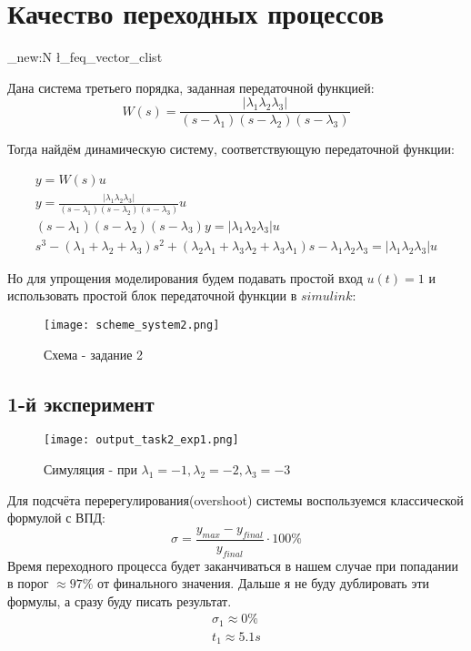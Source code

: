 \chapter{Качество переходных процессов}
\label{ch:chap2}

\ExplSyntaxOn
\clist_new:N \l_feq_vector_clist
\ExplSyntaxOff

Дана система третьего порядка, заданная передаточной функцией:
$$
W(s) = \frac{|\lambda_1\lambda_2\lambda_3|}{(s-\lambda_1)(s-\lambda_2)(s-\lambda_3)}
$$

Тогда найдём динамическую систему, соответствующую передаточной функции:


$$
\begin{aligned}
  y = W(s)u \\
  y = \frac{|\lambda_1\lambda_2\lambda_3|}{(s-\lambda_1)(s-\lambda_2)(s-\lambda_3)} u \\
  (s-\lambda_1)(s-\lambda_2)(s-\lambda_3)y = |\lambda_1\lambda_2\lambda_3| u  \\
  s^3 - (\lambda_1 + \lambda_2 + \lambda_3)s^2 + (\lambda_2\lambda_1 + \lambda_3\lambda_2 + \lambda_3\lambda_1)s - \lambda_1\lambda_2\lambda_3 = |\lambda_1\lambda_2\lambda_3| u  
\end{aligned}
$$

Но для упрощения моделирования будем подавать простой вход $u(t) = 1$ и использовать простой блок передаточной функции в $\textit{simulink}$:
\begin{figure}[ht]
    \centering
    \texttt{[image: scheme\_system2.png]}
  \caption{Схема - задание 2}
\end{figure}


\newpage
\section{1-й эксперимент}
\begin{figure}[ht]
    \centering
    \texttt{[image: output\_task2\_exp1.png]}
  \caption{Симуляция - при $\lambda_1 = -1, \lambda_2 = -2,\lambda_3 = -3$}
\end{figure}
Для подсчёта перерегулирования(overshoot) системы воспользуемся классической формулой с ВПД:
$$
\sigma = \frac{y_{max} - y_{final}}{y_{final}}\cdot 100\%
$$
Время переходного процесса будет заканчиваться в нашем случае при попадании в порог $\approx97\%$ от финального значения.
Дальше я не буду дублировать эти формулы, а сразу буду писать результат.
$$
\begin{aligned}
  \sigma_1 \approx 0\% \\
  t_1 \approx 5.1s
\end{aligned}
$$

